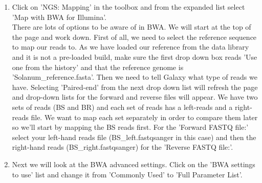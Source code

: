 \documentclass[12pt,a4paper]{article}
\begin{document}
\begin{enumerate}
	\item Click on 'NGS: Mapping' in the toolbox and from the
          expanded list select 'Map with BWA for Illumina'.  \\

          There are lots of options to be aware of in BWA. We will
          start at the top of the page and work down. First of all, we
          need to select the reference sequence to map our reads
          to. As we have loaded our reference from the data library
          and it is not a pre-loaded build, make sure the first drop
          down box reads 'Use one from the history' and that the
          reference genome is 'Solanum\_reference.fasta'. Then
          we need to tell Galaxy what type of reads we have. Selecting
          'Paired-end' from the next drop down list will refresh the
          page and drop-down lists for the forward and reverse files
          will appear. We have two sets of reads (BS and BR) and each
          set of reads has a left-reads and a right-reads file. We
          want to map each set separately in order to compare them
          later so we'll start by mapping the BS reads first. For the
          'Forward FASTQ file:' select your left-hand reads file
          (BS\_left.fastqsanger in this case) and then the right-hand
          reads (BS\_right.fastqsanger) for the 'Reverse FASTQ file:'.

	\item Next we will look at the BWA advanced settings. Click on
          the 'BWA settings to use' list and change it from 'Commonly
          Used' to 'Full Parameter List'.


\end{enumerate}
\end{document}
